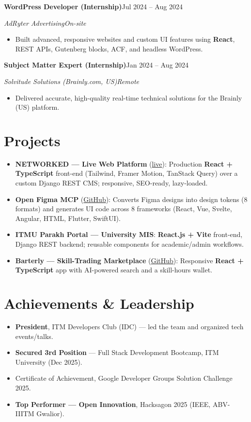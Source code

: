 \documentclass[a4paper,10pt]{article}
\newcommand{\entry}[4]{%
  \vspace{3pt}%
  \textbf{#1}\hfill #2\par
  \vspace{1pt}%
  \textit{#3}\hfill \textit{#4}\par
  \vspace{2pt}%
}
\begin{document}
\entry{WordPress Developer (Internship)}{Jul 2024 -- Aug 2024}{AdRyter Advertising}{On-site}
\begin{itemize}
  \item Built advanced, responsive websites and custom UI features using \textbf{React}, REST APIs,
        Gutenberg blocks, ACF, and headless WordPress.
\end{itemize}

\entry{Subject Matter Expert (Internship)}{Jan 2024 -- Aug 2024}{Solvitude Solutions (Brainly.com, US)}{Remote}
\begin{itemize}
  \item Delivered accurate, high-quality real-time technical solutions for the Brainly (US) platform.
\end{itemize}

\section{Projects}
\begin{itemize}
  \item \textbf{NETWORKED --- Live Web Platform} (\href{https://networkedconsultancy.com}{live}):
        Production \textbf{React + TypeScript} front-end (Tailwind, Framer Motion, TanStack Query)
        over a custom Django REST CMS; responsive, SEO-ready, lazy-loaded.
  \item \textbf{Open Figma MCP} (\href{https://github.com/Shivam990q/open-figma-mcp}{GitHub}):
        Converts Figma designs into design tokens (8 formats) and generates UI code across 8
        frameworks (React, Vue, Svelte, Angular, HTML, Flutter, SwiftUI).
  \item \textbf{ITMU Parakh Portal --- University MIS}: \textbf{React.js + Vite} front-end,
        Django REST backend; reusable components for academic/admin workflows.
  \item \textbf{Barterly --- Skill-Trading Marketplace} (\href{https://github.com/Shivam990q/Barterly-Redesigned}{GitHub}):
        Responsive \textbf{React + TypeScript} app with AI-powered search and a skill-hours wallet.
\end{itemize}

\section{Achievements \& Leadership}
\begin{itemize}
  \item \textbf{President}, ITM Developers Club (IDC) --- led the team and organized tech events/talks.
  \item \textbf{Secured 3rd Position} --- Full Stack Development Bootcamp, ITM University (Dec 2025).
  \item Certificate of Achievement, Google Developer Groups Solution Challenge 2025.
  \item \textbf{Top Performer --- Open Innovation}, Hacksagon 2025 (IEEE, ABV-IIITM Gwalior).
\end{itemize}
\end{document}
